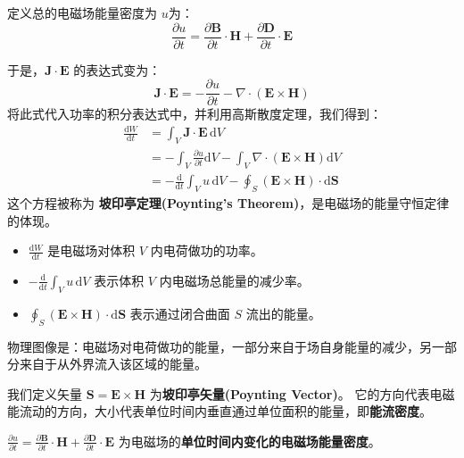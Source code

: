 \documentclass[fontset=none]{ctexart}
\begin{document}
定义总的电磁场能量密度为 $u$为：
\begin{equation}
    \frac{\partial u}{\partial t} 
    = \frac{\partial \bm{B}}{\partial t} \cdot \bm{H} 
    + \frac{\partial \bm{D}}{\partial t} \cdot \bm{E}
\end{equation}

于是，$\bm{J} \cdot \bm{E}$ 的表达式变为：
\begin{equation}
    \bm{J} \cdot \bm{E} = - \frac{\partial u}{\partial t} - \nabla \cdot (\bm{E} \times \bm{H})
\end{equation}
将此式代入功率的积分表达式中，并利用高斯散度定理，我们得到：
\begin{equation}
\begin{aligned}
    \frac{\mathrm{d}W}{\mathrm{d}t} &= \int_V \bm{J} \cdot \bm{E} \, \mathrm{d}V \\
    &= -\int_V \frac{\partial u}{\partial t} \mathrm{d}V 
    - \int_V \nabla \cdot (\bm{E} \times \bm{H}) \mathrm{d}V \\
    &= -\frac{\mathrm{d}}{\mathrm{d}t}\int_V u \, \mathrm{d}V 
    - \oint_S (\bm{E} \times \bm{H}) \cdot \mathrm{d}\bm{S}
\end{aligned}
\end{equation}
这个方程被称为 \textbf{坡印亭定理(Poynting's Theorem)}，是电磁场的能量守恒定律的体现。
\begin{itemize}
    \item $\frac{\mathrm{d}W}{\mathrm{d}t}$ 是电磁场对体积 $V$ 内电荷做功的功率。
    \item $-\frac{\mathrm{d}}{\mathrm{d}t}\int_V u \, \mathrm{d}V$ 表示体积 $V$ 内电磁场总能量的减少率。
    \item $\oint_S (\bm{E} \times \bm{H}) \cdot \mathrm{d}\bm{S}$ 表示通过闭合曲面 $S$ 流出的能量。
\end{itemize}
物理图像是：电磁场对电荷做功的能量，一部分来自于场自身能量的减少，另一部分来自于从外界流入该区域的能量。

\begin{definition}[坡印亭矢量与能量流密度]
我们定义矢量 $\bm{S} = \bm{E} \times \bm{H}$ 为\textbf{坡印亭矢量(Poynting Vector)}。
它的方向代表电磁能流动的方向，大小代表单位时间内垂直通过单位面积的能量，即\textbf{能流密度}。
\end{definition}

\begin{definition}[单位时间内变化的电磁场能量密度]
$\frac{\partial u}{\partial t} 
= \frac{\partial \bm{B}}{\partial t} \cdot \bm{H} 
+ \frac{\partial \bm{D}}{\partial t} \cdot \bm{E}$ 
为电磁场的\textbf{单位时间内变化的电磁场能量密度}。
\end{definition}
\end{document}
